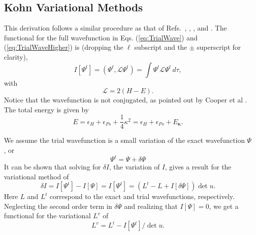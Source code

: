 \documentclass[preprint,showpacs,preprintnumbers,amsmath,amssymb,longbibliography,pra,aps]{revtex4-1}
\newcommand{\beq}{\begin{equation}}
\newcommand{\eeq}{\end{equation}}
\begin{document}
\subsection{Kohn Variational Methods}
\label{sec:Kohn}
This derivation follows a similar procedure as that of Refs.~\cite{Lucchese1989}, \cite{Cooper2010}, \cite{Armour1991}, and \cite{VanReethThesis}.
The functional for the full wavefunction in Eqs. (\ref{eq:TrialWave}) and (\ref{eq:TrialWaveHigher}) is (dropping the $\ell$ subscript and the $\pm$ superscript for clarity),
\begin{equation}
I[\Psi^t] = \left(\Psi^t, \mathcal{L} \Psi^t \right) = \int \Psi^t \mathcal{L} \Psi^t \,d\tau,
\label{eq:IlDefPsi}
\end{equation}
with
\beq
\mathcal{L} = 2(H - E).
\label{eq:LDef}
\eeq
Notice that the wavefunction is not conjugated, as pointed out by Cooper et al \cite{Cooper2010}. The total energy is given by
\begin{equation}
\label{eq:TotalEnergy}
E = \epsilon_H + \epsilon_{Ps} + \frac{1}{4}\kappa^2 = \epsilon_H + \epsilon_{Ps} + E_{\bm \kappa}.
\end{equation}

We assume the trial wavefunction is a small variation of the exact wavefunction $\Psi$, or
\beq
\Psi^t = \Psi + \delta \Psi
\label{eq:PsiTrialRelation}
\eeq
It can be shown that solving for $\delta I$, the variation of $I$, gives a result for the variational method of
\beq
\delta I = I[\Psi^t] - I[\Psi] = I[\Psi^t] = (L^t - L + I[\delta \Psi]) \det u.
\label{eq:IlPsiVariation}
\eeq
Here $L$ and $L^t$ correspond to the exact and trial wavefunctions, respectively. Neglecting the second order term in $\delta \Psi$ and realizing that $I[\Psi] = 0$, we get a functional for the variational $L^v$ of
\beq
L^v = L^t - I[\Psi^t] / \det u.
\label{eq:ComplexKohnVariation}
\eeq
\end{document}
